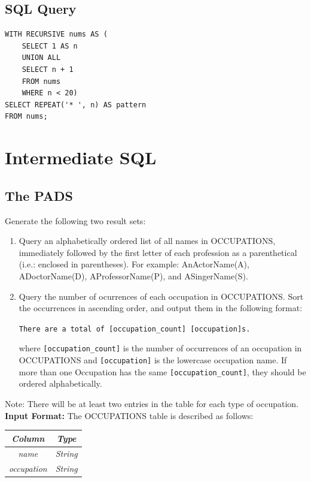 \documentclass[12pt,a4paper]{article}
\renewcommand{\arraystretch}{1.5} %
\begin{document}
\subsection*{SQL Query}
\begin{lstlisting}[style=sqlstyle]
WITH RECURSIVE nums AS (
    SELECT 1 AS n
    UNION ALL
    SELECT n + 1
    FROM nums
    WHERE n < 20)
SELECT REPEAT('* ', n) AS pattern
FROM nums;
\end{lstlisting}
\newpage
\section{Intermediate SQL}
\subsection{The PADS}
Generate the following two result sets:
\begin{enumerate}
    \item Query an alphabetically ordered list of all names in OCCUPATIONS, immediately followed by the first letter of each profession as a parenthetical (i.e.: enclosed in parentheses). For example: AnActorName(A), ADoctorName(D), AProfessorName(P), and ASingerName(S).
    \item Query the number of ocurrences of each occupation in OCCUPATIONS. Sort the occurrences in ascending order, and output them in the following format:
    \begin{center}
        \texttt{There are a total of [occupation\_count] [occupation]s.}
    \end{center}
    where \texttt{[occupation\_count]} is the number of occurrences of an occupation in OCCUPATIONS and \texttt{[occupation]} is the lowercase occupation name. If more than one Occupation has the same \texttt{[occupation\_count]}, they should be ordered alphabetically.
\end{enumerate}
Note: There will be at least two entries in the table for each type of occupation.
\textbf{Input Format:}
The OCCUPATIONS table is described as follows:
\begin{table}[H]
\centering
\renewcommand{\arraystretch}{1.3}
\begin{tabular}{|c|c|} \hline
\textit{Column} & \textit{Type} \\ \hline
\textit{name} & \textit{String} \\ \hline
\textit{occupation} & \textit{String} \\ \hline
\end{tabular}
\end{table}
\end{document}
